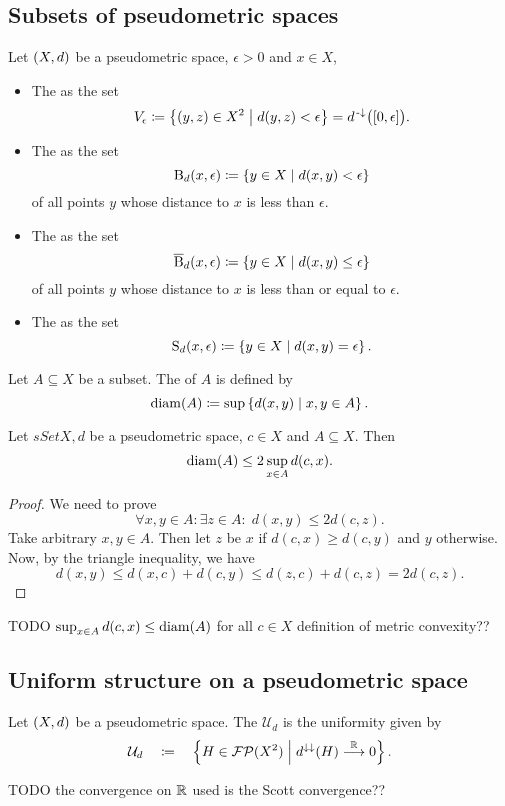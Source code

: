 \subsection{Subsets of pseudometric spaces}
\begin{definition}
Let $\left( X,d \right)$ be a pseudometric space, $\epsilon >0$ and $x\in X$,
\begin{itemize}
\item The  as the set
\[ V_\epsilon \defeq \setbuilder{(y,z)\in X^2}{d(y,z)< \epsilon} = d^{\preimf}\big(\interval{0,\epsilon}\big). \]
\item The  as the set
\[ \operatorname{B}_d(x,\epsilon) \coloneqq \left\{ y\in X \;\middle|\; d(x,y)< \epsilon \right\} \]
of all points $y$ whose distance to $x$ is less than $\epsilon$.
\item The  as the set
\[ \operatorname{\overline{B}}_d(x,\epsilon) \coloneqq \left\{ y\in X \;\middle|\; d(x,y)\leq \epsilon \right\} \]
of all points $y$ whose distance to $x$ is less than or equal to $\epsilon$.
\item The  as the set
\[ \operatorname{S}_d(x,\epsilon) \coloneqq \left\{ y\in X \;\middle|\; d(x,y) = \epsilon \right\}. \]
\end{itemize}
Let $A\subseteq X$ be a subset. The  of $A$ is defined by
\[ \operatorname{diam}(A) \coloneqq \sup \left\{ d(x,y) \;\middle|\; x,y\in A \right\}. \]
\end{definition}

\begin{lemma} \label{diameterBoundedByTwiceRadius}
Let $sSet{X,d}$ be a pseudometric space, $c\in X$ and $A\subseteq X$. Then
\[ \operatorname{diam}(A) \leq 2\sup_{x\in A}d(c,x). \]
\end{lemma}
\begin{proof}
We need to prove
\[ \forall x,y\in A: \exists z\in A: \; d(x,y) \leq 2d(c,z). \]
Take arbitrary $x,y\in A$. Then let $z$ be $x$ if $d(c,x)\geq d(c,y)$ and $y$ otherwise. Now, by the triangle inequality, we have
\[ d(x,y) \leq d(x,c) + d(c,y) \leq d(z,c) + d(c,z) = 2d(c,z). \]
\end{proof}

TODO $\sup_{x\in A}{d(c,x)} \leq \operatorname{diam}(A)$ for all $c\in X$ definition of metric convexity??

\subsection{Uniform structure on a pseudometric space}
\begin{definition}
Let $\left( X,d \right)$ be a pseudometric space. The  $\mathcal{U}_d$ is the uniformity given by
\[ \mathcal{U}_d \quad\coloneqq\quad \left\{ H\in \operatorname{\mathcal{FP}}(X^2) \;\middle|\; d^{\downarrow\downarrow}(H) \overset{\mathbb{R}}{\longrightarrow} 0 \right\}.  \]
\end{definition}
TODO the convergence on $\mathbb{R}$ used is the Scott convergence??

